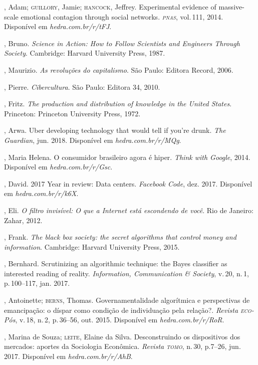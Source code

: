 \begin{bibliohedra}
, Adam; \textsc{guillory}, Jamie; \textsc{hancock}, Jeffrey. Experimental evidence of massive-scale emotional contagion through social networks. \textit{\textsc{pnas}}, vol.\,111, 2014. Disponível em \textit{hedra.com.br/r/tFJ}.

, Bruno. \textit{Science in Action: How to Follow Scientists and
Engineers Through Society}. Cambridge: Harvard University Press, 1987.

, Maurizio. \textit{As revoluções do capitalismo}. São Paulo: Editora
Record, 2006.

, Pierre. \textit{Cibercultura}. São Paulo: Editora 34, 2010.

, Fritz. \textit{The production and distribution of knowledge in the
United States}. Princeton: Princeton University Press, 1972.

, Arwa. Uber developing technology that would tell if you're
drunk. \textit{The Guardian}, jun. 2018. Disponível em \textit{hedra.com.br/r/MQg}.

, Maria Helena. O consumidor brasileiro agora é hiper. \textit{Think
with Google}, 2014. Disponível em \textit{hedra.com.br/r/Gsc}.

, David. 2017 Year in review: Data centers. \textit{Facebook Code},
dez. 2017. Disponível em \textit{hedra.com.br/r/k6X}.

, Eli. \textit{O filtro invisível: O que a Internet está escondendo
de você}. Rio de Janeiro: Zahar, 2012.

, Frank. \textit{The black box society: the secret algorithms that
control money and information}. Cambridge: Harvard University Press, 2015.

, Bernhard. Scrutinizing an algorithmic technique: the Bayes
classifier as interested reading of reality. \textit{Information, Communication
\& Society}, v.\,20, n.\,1, p.\,100--117, jan. 2017.

, Antoinette; \textsc{berns}, Thomas. Governamentalidade
algorítmica e perspectivas de emancipação: o díspar como condição de
individuação pela relação?. \textit{Revista \textsc{eco}-Pós}, v.\,18, n.\,2, p.\,36--56, out. 2015. Disponível em \textit{hedra.com.br/r/RoR}.

, Marina de Souza; \textsc{leite}, Elaine da Silva. Desconstruindo os
dispositivos dos mercados: aportes da Sociologia Econômica. \textit{Revista
\textsc{tomo}}, n.\,30, p.7--26, jun. 2017. Disponível em \textit{hedra.com.br/r/AhB}.


\end{bibliohedra}
